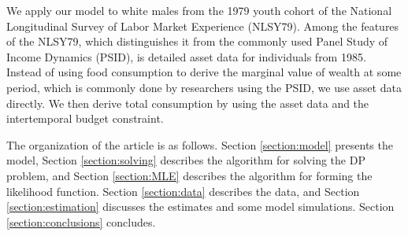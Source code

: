 \documentclass{article}
\begin{document}
We apply our model to white males from the 1979 youth cohort of the National Longitudinal Survey of Labor Market Experience (NLSY79). Among the features of the NLSY79, which distinguishes it from the commonly used Panel Study of Income Dynamics (PSID), is detailed asset data for individuals from 1985. Instead of using food consumption to derive the marginal value of wealth at some period, which is commonly done by researchers using the PSID, we use asset data directly. We then derive total consumption by using the asset data and the intertemporal budget constraint. \par
The organization of the article is as follows. Section \ref{section:model} presents the model, Section \ref{section:solving} describes the algorithm for solving the DP problem, and Section \ref{section:MLE} describes the algorithm for forming the likelihood function. Section \ref{section:data} describes the data, and Section \ref{section:estimation} discusses the estimates and some model simulations. Section \ref{section:conclusions} concludes.
\end{document}
